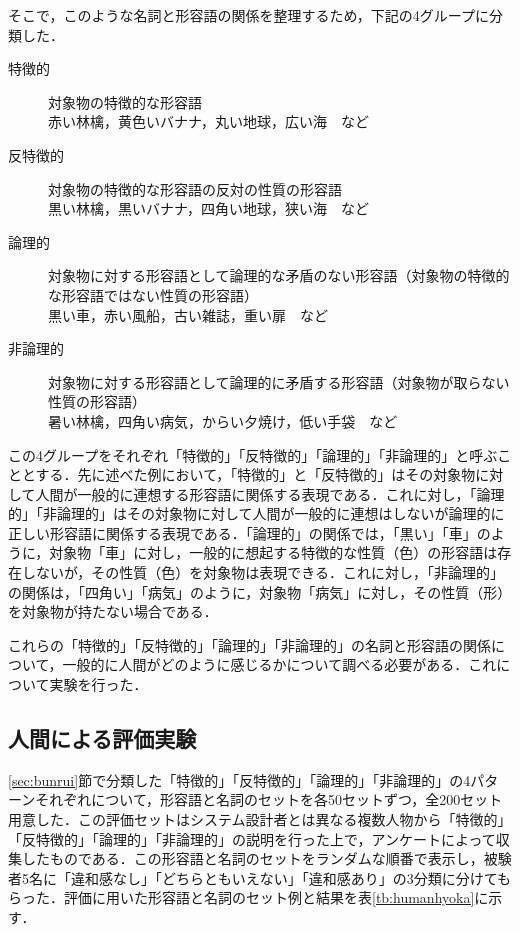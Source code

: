 \documentclass[japanese]{jnlp_1.4}
\begin{document}
そこで，このような名詞と形容語の関係を整理するため，下記の4グループに分類した．
\begin{description}
	\item[特徴的] 対象物の特徴的な形容語\\
		赤い林檎，黄色いバナナ，丸い地球，広い海　など
	\item[反特徴的] 対象物の特徴的な形容語の反対の性質の形容語\\
		黒い林檎，黒いバナナ，四角い地球，狭い海　など　
	\item[論理的] 対象物に対する形容語として論理的な矛盾のない形容語（対象物の特徴的な形容語ではない性質の形容語）\\
		黒い車，赤い風船，古い雑誌，重い扉　など 
	\item[非論理的] 対象物に対する形容語として論理的に矛盾する形容語（対象物が取らない性質の形容語）\\
		暑い林檎，四角い病気，からい夕焼け，低い手袋　など 
\end{description}
この4グループをそれぞれ「特徴的」「反特徴的」「論理的」「非論理的」と呼ぶこととする．先に述べた例において，「特徴的」と「反特徴的」はその対象物に対して人間が一般的に連想する形容語に関係する表現である．これに対し，「論理的」「非論理的」はその対象物に対して人間が一般的に連想はしないが論理的に正しい形容語に関係する表現である．「論理的」の関係では，「黒い」「車」のように，対象物「車」に対し，一般的に想起する特徴的な性質（色）の形容語は存在しないが，その性質（色）を対象物は表現できる．これに対し，「非論理的」の関係は，「四角い」「病気」のように，対象物「病気」に対し，その性質（形）を対象物が持たない場合である．

これらの「特徴的」「反特徴的」「論理的」「非論理的」の名詞と形容語の関係について，一般的に人間がどのように感じるかについて調べる必要がある．これについて実験を行った．


\subsection{人間による評価実験} \label{sec:humanjikken}

\ref{sec:bunrui}節で分類した「特徴的」「反特徴的」「論理的」「非論理的」の4パターンそれぞれについて，形容語と名詞のセットを各50セットずつ，全200セット用意した．この評価セットはシステム設計者とは異なる複数人物から「特徴的」「反特徴的」「論理的」「非論理的」の説明を行った上で，アンケートによって収集したものである．この形容語と名詞のセットをランダムな順番で表示し，被験者5名に「違和感なし」「どちらともいえない」「違和感あり」の3分類に分けてもらった．評価に用いた形容語と名詞のセット例と結果を表\ref{tb:humanhyoka}に示す．
\end{document}
